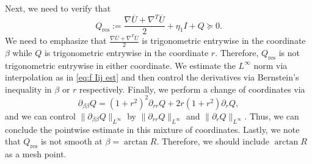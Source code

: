 \documentclass[11pt,a4paper]{article}
\numberwithin{equation}{section}
\newcommand{\assign}{:=}
\newcommand{\tmop}[1]{\ensuremath{\operatorname{#1}}}
\begin{document}
Next, we need to verify that
\begin{equation*}
  Q_{\tmop{res}} \assign \frac{\nabla \overline{U} + \nabla^T \overline{U}}{2}
  + \eta_1 I + Q \succeq 0. %
\end{equation*}
We need to emphasize that $\frac{\nabla \overline{U} + \nabla^T
\overline{U}}{2}$ is trigonometric entrywise in the coordinate $\beta$
while $Q$ is trigonometric entrywise in the coordinate $r$. Therefore,
$Q_{\tmop{res}}$ is not trigonometric entrywise in either coordinate. We estimate the $L^{\infty}$ norm via interpolation as in \eqref{eq:f Iij est} and then control the derivatives via Bernstein's inequality in $\beta$ or $r$ respectively. Finally, we perform a change of coordinates via
\[ \partial_{\beta \beta} Q = (1 + r^2)^2 \partial_{r r} Q + 2 r (1 + r^2)
   \partial_r Q, \]
and we can control $\| \partial_{\beta \beta} Q \|_{L^{\infty}}$ by $\|
\partial_{r r} Q \|_{L^{\infty}}$ and $\| \partial_r Q \|_{L^{\infty}}$. Thus, we can conclude the pointwise estimate in this mixture of coordinates. %
Lastly, we note that $Q_{\tmop{res}}$ is not smooth at $\beta = \arctan R$.
Therefore, we should include $\arctan R$ as a mesh point.
\end{document}
